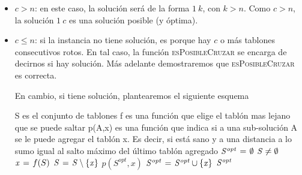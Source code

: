 \begin{itemize}
  \item $c > n$: en este caso, la solución será de la forma $1 \ k$, con $k > n$. Como $c > n$, la
  solución $1 \ c$ es una solución posible (y óptima).

  \item $c \leq n$: si la instancia no tiene solución, es porque hay $c$ o más tablones
  consecutivos rotos. En tal caso, la función \textsc{esPosibleCruzar} se encarga de
  decirnos si hay solución. Más adelante demostraremos que \textsc{esPosibleCruzar}
  es correcta. \medskip

  En cambio, si tiene solución, plantearemos el siguiente esquema

  \begin{codebox}
  \li \Comment S es el conjunto de tablones
  \li \Comment f es una función que elige el tablón mas lejano que se puede saltar
  \li \Comment p(A,x) es una función que indica si a una sub-solución A se le
  \li \Comment   puede agregar el tablón x. Es decir, si está sano y a una distancia
  \li \Comment   a lo sumo igual al salto máximo del último tablón agregado
  \li $\id{S^{opt}} \gets \emptyset$
  \li \While $\id{S} \neq \emptyset$
  \li     \Do
    			$\id{x} \gets f(S)$
  \li  			$\id{S} \gets \id{S} \setminus \{\id{x}\}$
  \li			\If $p(S^{opt}, x)$
  \li				\Then
    					$\id{S^{opt}} \gets \id{S^{opt}} \cup \{\id{x}\}$
    				\End
    		\End
  \li \Return $\id{S^{opt}}$
  \end{codebox}


\end{itemize}
